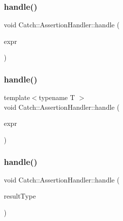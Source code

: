\mbox{\label{classCatch_1_1AssertionHandler_a39b33cd04bf5ddaf81bd0aa64cbe65aa}} 
\subsubsection{\texorpdfstring{handle()}{handle()}\hspace{0.1cm}{\footnotesize\ttfamily [1/6]}}
{\footnotesize\ttfamily void Catch\+::\+Assertion\+Handler\+::handle (\begin{DoxyParamCaption}\item[{\mbox{\hyperlink{structCatch_1_1ITransientExpression}{I\+Transient\+Expression}} const \&}]{expr }\end{DoxyParamCaption})}

\mbox{\label{classCatch_1_1AssertionHandler_a307f27a86452decea7384a5ab524fcfd}} 
\subsubsection{\texorpdfstring{handle()}{handle()}\hspace{0.1cm}{\footnotesize\ttfamily [2/6]}}
{\footnotesize\ttfamily template$<$typename T $>$ \\
void Catch\+::\+Assertion\+Handler\+::handle (\begin{DoxyParamCaption}\item[{\mbox{\hyperlink{classCatch_1_1ExprLhs}{Expr\+Lhs}}$<$ T $>$ const \&}]{expr }\end{DoxyParamCaption})\hspace{0.3cm}{\ttfamily [inline]}}

\mbox{\label{classCatch_1_1AssertionHandler_af04d943755b1f27374f7edf32c190942}} 
\subsubsection{\texorpdfstring{handle()}{handle()}\hspace{0.1cm}{\footnotesize\ttfamily [3/6]}}
{\footnotesize\ttfamily void Catch\+::\+Assertion\+Handler\+::handle (\begin{DoxyParamCaption}\item[{\mbox{\hyperlink{structCatch_1_1ResultWas_a624e1ee3661fcf6094ceef1f654601ef}{Result\+Was\+::\+Of\+Type}}}]{result\+Type }\end{DoxyParamCaption})}

